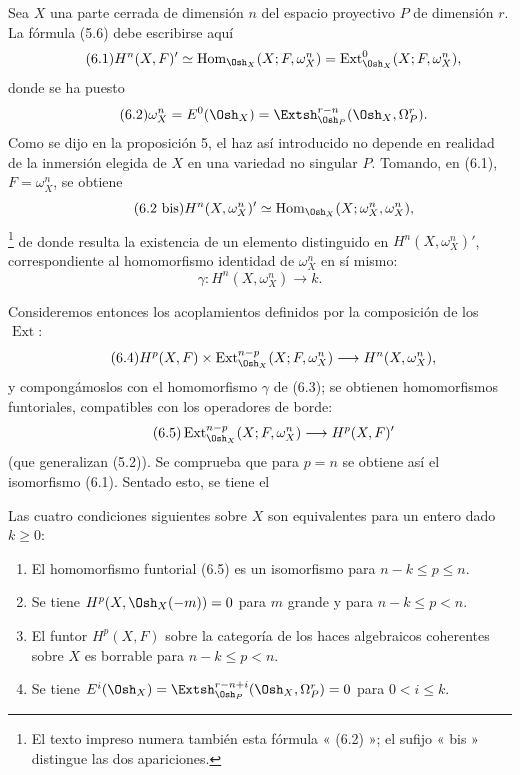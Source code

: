 
Sea $X$ una parte cerrada de dimensión $n$ del espacio proyectivo $P$ de
dimensión $r$. La fórmula (5.6) debe escribirse aquí
\begin{equation}\tag{6.1}
  H^{n}(X,F)'
  \simeq\operatorname{Hom}_{\Osh_X}(X;F,\omega_X^{n})
  =\operatorname{Ext}_{\Osh_X}^{0}(X;F,\omega_X^{n}),
\end{equation}
donde se ha puesto
\begin{equation}\tag{6.2}
  \omega_X^{n}=E^{0}(\Osh_X)
  =\Extsh_{\Osh_P}^{r-n}(\Osh_X,\Omega_P^{r}).
\end{equation}
Como se dijo en la proposición 5, el haz así introducido no depende
en realidad de la inmersión elegida de $X$ en una variedad no singular $P$.
Tomando, en (6.1), $F=\omega_X^{n}$, se obtiene
\begin{equation}\tag{6.2 bis}
  H^{n}(X,\omega_X^{n})'
  \simeq\operatorname{Hom}_{\Osh_X}(X;\omega_X^{n},\omega_X^{n}),
\end{equation}
\footnote{El texto impreso numera también esta fórmula « (6.2) »; el sufijo
« bis » distingue las dos apariciones.} de donde resulta la existencia de un elemento
distinguido en $H^{n}(X,\omega_X^{n})'$, correspondiente al homomorfismo
identidad de $\omega_X^{n}$ en sí mismo:
\begin{equation}\tag{6.3}
  \gamma:H^{n}(X,\omega_X^{n})\longrightarrow k.
\end{equation}

Consideremos entonces los acoplamientos definidos por la composición de los $\operatorname{Ext}$:
\begin{equation}\tag{6.4}
  H^{p}(X,F)\times
  \operatorname{Ext}_{\Osh_X}^{n-p}(X;F,\omega_X^{n})
  \longrightarrow H^{n}(X,\omega_X^{n}),
\end{equation}
y compongámoslos con el homomorfismo $\gamma$ de (6.3); se obtienen
homomorfismos funtoriales, compatibles con los operadores de borde:
\begin{equation}\tag{6.5}
  \operatorname{Ext}_{\Osh_X}^{n-p}(X;F,\omega_X^{n})
  \longrightarrow H^{p}(X,F)'
\end{equation}
(que generalizan (5.2)). Se comprueba que para $p=n$ se obtiene así
el isomorfismo (6.1). Sentado esto, se tiene el

 Las cuatro condiciones siguientes sobre $X$ son
equivalentes para un entero dado $k\geq0$:
\begin{enumerate}
  \item[\textit{i.}] El homomorfismo funtorial (6.5) es un isomorfismo para
    $n-k\leq p\leq n$.
  \item[\textit{ii.}] Se tiene $H^{p}(X,\Osh_X(-m))=0$ para $m$ grande y para
    $n-k\leq p<n$.
  \item[\textit{iii.}] El funtor $H^{p}(X,F)$ sobre la categoría de los haces
    algebraicos coherentes sobre $X$ es borrable para $n-k\leq p<n$.
  \item[\textit{iv.}] Se tiene
    $E^{i}(\Osh_X)=\Extsh_{\Osh_P}^{r-n+i}(\Osh_X,\Omega_P^{r})=0$
    para $0<i\leq k$.
\end{enumerate}

